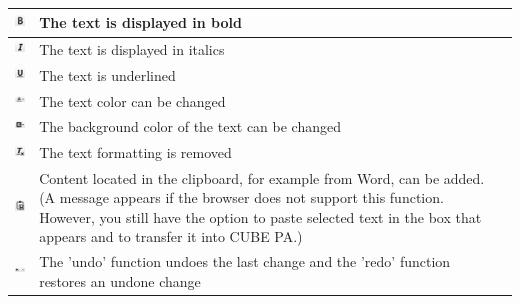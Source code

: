 \begin{tabular}{c | p{14cm} l} %
\hline
\includegraphics[height=12pt]{../chapters/09_Qualitaetsmanagement/pictures/Format/Fett.jpg} & The text is displayed in bold \\
\hline
\includegraphics[height=12pt]{../chapters/09_Qualitaetsmanagement/pictures/Format/Kursiv.jpg} & The text is displayed in italics \\
\hline
\includegraphics[height=12pt]{../chapters/09_Qualitaetsmanagement/pictures/Format/Unterstrichen.jpg} & The text is underlined \\
\hline
\includegraphics[height=12pt]{../chapters/09_Qualitaetsmanagement/pictures/Format/Textfarbe.jpg} & The text color can be changed \\
\hline
\includegraphics[height=12pt]{../chapters/09_Qualitaetsmanagement/pictures/Format/Hintergrundfarbe.jpg} & The background color of the text can be changed \\
\hline
\includegraphics[height=12pt]{../chapters/09_Qualitaetsmanagement/pictures/Format/Form_z.jpg} & The text formatting is removed \\
\hline
\includegraphics[height=12pt]{../chapters/09_Qualitaetsmanagement/pictures/Format/ausWord.jpg} & Content located in the clipboard, for example from Word, can be added. (A message appears if the browser does not support this function. However, you still have the option to paste selected text in the box that appears and to transfer it into CUBE PA.) \\
\hline
\includegraphics[height=12pt]{../chapters/09_Qualitaetsmanagement/pictures/Format/Undo.jpg} & The 'undo' function undoes the last change and the 'redo' function restores an undone change \\

\end{tabular}
